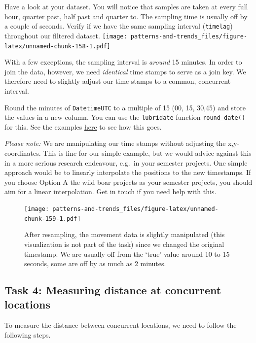\documentclass[]{book}
\begin{document}
Have a look at your dataset. You will notice that samples are taken at every full hour, quarter past, half past and quarter to. The sampling time is usually off by a couple of seconds. Verify if we have the same sampling interval (\texttt{timelag}) throughout our filtered dataset.
\texttt{[image: patterns-and-trends\_files/figure-latex/unnamed-chunk-158-1.pdf]}

With a few exceptions, the sampling interval is \emph{around} 15 minutes. In order to join the data, however, we need \emph{identical} time stamps to serve as a join key. We therefore need to slightly adjust our time stamps to a common, concurrent interval.

Round the minutes of \texttt{DatetimeUTC} to a multiple of 15 (00, 15, 30,45) and store the values in a new column. You can use the \texttt{lubridate} function \texttt{round\_date()} for this. See the examples \href{https://lubridate.tidyverse.org/reference/round_date.html}{here} to see how this goes.

\emph{Please note:} We are manipulating our time stamps without adjusting the x,y-coordinates. This is fine for our simple example, but we would advice against this in a more serious research endeavour, e.g.~in your semester projects. One simple approach would be to linearly interpolate the positions to the new timestamps. If you choose Option A the wild boar projects as your semester projects, you should aim for a linear interpolation. Get in touch if you need help with this.

\begin{figure}
\centering
\texttt{[image: patterns-and-trends\_files/figure-latex/unnamed-chunk-159-1.pdf]}
\caption{\label{fig:unnamed-chunk-159}After resampling, the movement data is slightly manipulated (this visualization is not part of the task) since we changed the original timestamp. We are usually off from the `true' value around 10 to 15 seconds, some are off by as much as 2 minutes.}
\end{figure}

\hypertarget{task-4-measuring-distance-at-concurrent-locations}{%
\subsection{Task 4: Measuring distance at concurrent locations}\label{task-4-measuring-distance-at-concurrent-locations}}

To measure the distance between concurrent locations, we need to follow the following steps.
\end{document}
